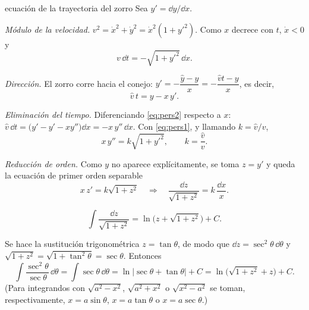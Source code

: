 \documentclass[11pt,twoside]{article}
\newcommand\vh{\hat v}
\newcommand\yhh{\hat y}
\newcommand\abs[1]{\lvert#1\rvert}
\begin{document}
\begin{desarrollo}{ecuación de la trayectoria del zorro}
Sea $y'=\dd y/\dd x$.
\begin{pasos}
\item \emph{Módulo de la velocidad.} $v^2=\dot x^2+\dot y^2=\dot x^2(1+y'^2)$. Como $x$ decrece con $t$, $\dot x<0$ y
\begin{equation}\label{eq:pers1}
v\,\dd t=-\sqrt{1+y'^2}\,\dd x.
\end{equation}
\item \emph{Dirección.} El zorro corre hacia el conejo: $y'=-\dfrac{\yhh-y}{x}=-\dfrac{\vh t-y}{x}$, es decir,
\begin{equation}\label{eq:pers2}
\vh\,t=y-x\,y'.
\end{equation}
\item \emph{Eliminación del tiempo.} Diferenciando \eqref{eq:pers2} respecto a $x$: $\vh\,\dd t=\big(y'-y'-xy''\big)\dd x=-x\,y''\,\dd x$.
Con \eqref{eq:pers1}, y llamando $k=\vh/v$,
\begin{equation}\label{eq:pers3}
x\,y''=k\sqrt{1+y'^2},\qquad k=\frac{\vh}{v}.
\end{equation}
\item \emph{Reducción de orden.} Como $y$ no aparece explícitamente, se toma $z=y'$ y queda la ecuación de primer orden separable
\begin{equation*}
x\,z'=k\sqrt{1+z^2}\quad\Longrightarrow\quad\frac{\dd z}{\sqrt{1+z^2}}=k\,\frac{\dd x}{x}.
\end{equation*}
\end{pasos}
\end{desarrollo}

\begin{lema}\label{lem:primitiva}
\begin{equation*}
\int\frac{\dd z}{\sqrt{1+z^2}}=\ln\Big(z+\sqrt{1+z^2}\Big)+C.
\end{equation*}
\end{lema}

\begin{demostracion}
Se hace la sustitución trigonométrica $z=\tan\theta$, de modo que $\dd z=\sec^2\theta\,\dd\theta$ y
$\sqrt{1+z^2}=\sqrt{1+\tan^2\theta}=\sec\theta$. Entonces
\begin{equation*}
\int\frac{\sec^2\theta}{\sec\theta}\,\dd\theta=\int\sec\theta\,\dd\theta=\ln\abs{\sec\theta+\tan\theta}+C=\ln\Big(\sqrt{1+z^2}+z\Big)+C.
\end{equation*}
(Para integrandos con $\sqrt{a^2-x^2}$, $\sqrt{a^2+x^2}$ o $\sqrt{x^2-a^2}$ se toman, respectivamente, $x=a\sin\theta$,
$x=a\tan\theta$ o $x=a\sec\theta$.)
\end{demostracion}
\end{document}
